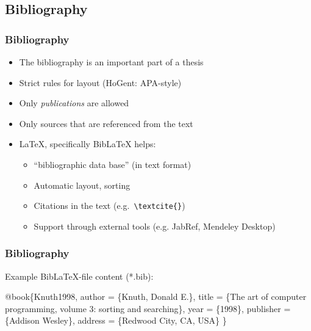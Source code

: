 \documentclass{beamer}
\begin{document}
\subsection{Bibliography}

\begin{frame}[fragile]
  \frametitle{Bibliography}

  \begin{itemize}
  \item<+-> The bibliography is an important part of a thesis
  \item<+-> Strict rules for layout (HoGent: APA-style)
  \item<+-> Only \emph{publications} are allowed
  \item<+-> Only sources that are referenced from the text
  \item<+-> {\LaTeX}, specifically Bib{\LaTeX} helps:
    \begin{itemize}
    \item<+-> ``bibliographic data base'' (in text format)
    \item<+-> Automatic layout, sorting
    \item<+-> Citations in the text (e.g.~\verb|\textcite{}|)
    \item<+-> Support through external tools (e.g. JabRef, Mendeley Desktop)
    \end{itemize}
  \end{itemize}
\end{frame}

\begin{frame}[fragile]
  \frametitle{Bibliography}

Example Bib{\LaTeX}-file content (*.bib):

\begin{semiverbatim}
\alert<2>{@book}\{\alert<4>{Knuth1998},
 \alert<3>{author} = \{Knuth, Donald E.\},
 \alert<3>{title} = \{The art of computer programming,  volume 3:
   sorting and searching\},
 \alert<3>{year} = \{1998\},
 publisher = \{Addison Wesley\},
 address = \{Redwood City, CA, USA\}
\} 
\end{semiverbatim}


\end{frame}
\end{document}
